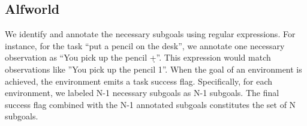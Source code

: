 

\subsection{Alfworld\label{sec: Annotation of alfworld}}
 We identify and annotate the necessary subgoals using regular expressions. For instance, for the task ``put a pencil on the desk'', we annotate one necessary observation as ``You pick up the pencil \d +''. This expression would match observations like ''You pick up the pencil 1''. When the goal of an environment is achieved, the environment emits a task success flag. Specifically, for each environment, we labeled N-1 necessary subgoals as N-1 subgoals. The final success flag combined with the N-1 annotated subgoals constitutes the set of N subgoals.



